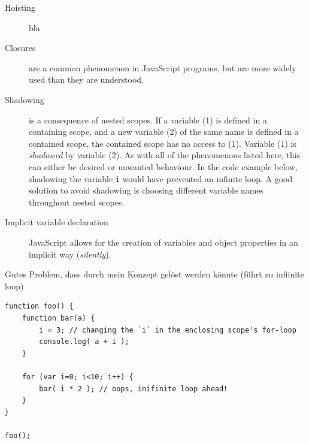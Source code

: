 \begin{description}
\item[Hoisting]
bla
\item[Closures]
are a common phenomenon in JavaScript programs, but are more widely used
than they are understood.
\item[Shadowing]
is a consequence of nested scopes. If a variable (1) is defined in a
containing scope, and a new variable (2) of the same name is defined in
a contained scope, the contained scope has no access to (1). Variable
(1) is \emph{shadowed} by variable (2). As with all of the phenomenons
listed here, this can either be desired or unwanted behaviour. In the
code example below, shadowing the variable \texttt{i} would have
prevented an infinite loop. A good solution to avoid shadowing is
choosing different variable names throughout nested scopes.
\item[Implicit variable declaration]
JavaScript allows for the creation of variables and object properties in
an implicit way (\emph{silently}).
\end{description}

Gutes Problem, dass durch mein Konzept gelöst werden könnte (führt zu
infiinite loop)

\begin{verbatim}
function foo() {
    function bar(a) {
        i = 3; // changing the `i` in the enclosing scope's for-loop
        console.log( a + i );
    }

    for (var i=0; i<10; i++) {
        bar( i * 2 ); // oops, inifinite loop ahead!
    }
}

foo();
\end{verbatim}

